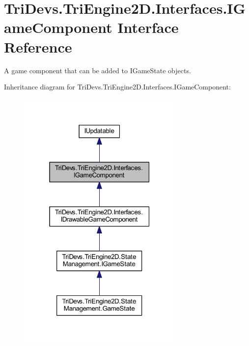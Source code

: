 \hypertarget{interface_tri_devs_1_1_tri_engine2_d_1_1_interfaces_1_1_i_game_component}{\section{Tri\-Devs.\-Tri\-Engine2\-D.\-Interfaces.\-I\-Game\-Component Interface Reference}
\label{interface_tri_devs_1_1_tri_engine2_d_1_1_interfaces_1_1_i_game_component}
}


A game component that can be added to I\-Game\-State objects.  




Inheritance diagram for Tri\-Devs.\-Tri\-Engine2\-D.\-Interfaces.\-I\-Game\-Component\-:
\nopagebreak
\begin{figure}[H]
\begin{center}
\leavevmode
\includegraphics[width=232pt]{interface_tri_devs_1_1_tri_engine2_d_1_1_interfaces_1_1_i_game_component__inherit__graph}
\end{center}
\end{figure}


